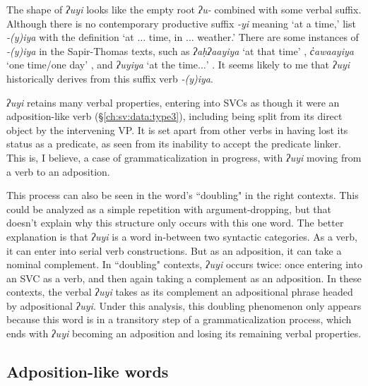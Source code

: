 The shape of \textit{ʔuyi} looks like the empty root \textit{ʔu-} combined with some verbal suffix. Although there is no contemporary productive suffix \textit{-yi} meaning `at a time,' \citet[p.~320]{sapir1939} list \textit{-(y)iya} with the definition `at $\ldots$ time, in $\ldots$ weather.' There are some instances of \textit{-(y)iya} in the Sapir-Thomas texts, such as \textit{ʔaḥʔaayiya} `at that time' \citep[p.~16]{sapir1939}, \textit{c̓awaayiya} `one time/one day' \citep[p.~19]{sapir1939}, and \textit{ʔuyiya} `at the time$\ldots$' \citep[p.~112]{sapir1939}. %
It seems likely to me that \textit{ʔuyi} historically derives from this suffix verb \textit{-(y)iya}.

\textit{ʔuyi} retains many verbal properties, entering into SVCs as though it were an adposition-like verb (\S\ref{ch:sv:data:type3}), including being split from its direct object by the intervening VP. It is set apart from other verbs in having lost its status as a predicate, as seen from its inability to accept the predicate linker. This is, I believe, a case of grammaticalization in progress, with \textit{ʔuyi} moving from a verb to an adposition.

This process can also be seen in the word's ``doubling" in the right contexts. This could be analyzed as a simple repetition with argument-dropping, but that doesn't explain why this structure only occurs with this one word. The better explanation is that \textit{ʔuyi} is a word in-between two syntactic categories. As a verb, it can enter into serial verb constructions. But as an adposition, it can take a nominal complement. In ``doubling" contexts, \textit{ʔuyi} occurs twice: once entering into an SVC as a verb, and then again taking a complement as an adposition. In these contexts, the verbal \textit{ʔuyi} takes as its complement an adpositional phrase headed by adpositional \textit{ʔuyi}. Under this analysis, this doubling phenomenon only appears because this word is in a transitory step of a grammaticalization process, which ends with \textit{ʔuyi} becoming an adposition and losing its remaining verbal properties.

\subsection{Adposition-like words} \label{ch:link:adpositive}

